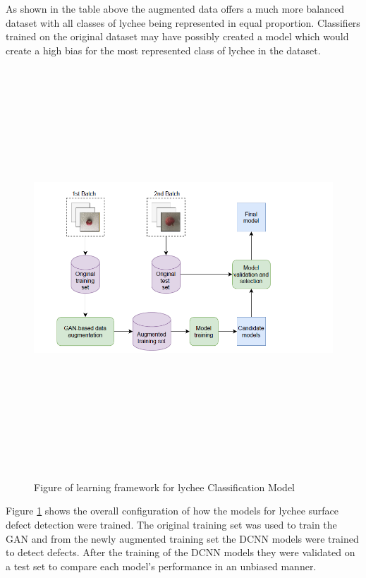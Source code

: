 As shown in the table above the augmented data offers a much more balanced dataset with all classes of lychee being represented in equal proportion.  Classifiers trained on the original dataset may have possibly created a model which would create a high bias for the most represented class of lychee in the dataset. 

 \begin{figure}[H]
    \centering
    \includegraphics[width=1\textwidth,height=15cm,keepaspectratio]{Images/lycheeGANSetup.PNG}\\
    \caption{Figure of learning framework for lychee Classification Model\cite{litReviewLychee}}
    \label{fig:Figure of learning framework for lychee Classification Model (lychee Surface Defect Detection Based on Deep Convolutional Neural Networks with GAN-Based Data Augmentation) }
\end{figure}
\vspace{0.5mm}
Figure \ref{fig:Figure of learning framework for lychee Classification Model (lychee Surface Defect Detection Based on Deep Convolutional Neural Networks with GAN-Based Data Augmentation) } shows the overall configuration of how the models for lychee surface defect detection were trained.  The original training set was used to train the GAN and from the newly augmented training set the DCNN models were trained to detect defects.  After the training of the DCNN models they were validated on a test set to compare each model's performance in an unbiased manner. 
